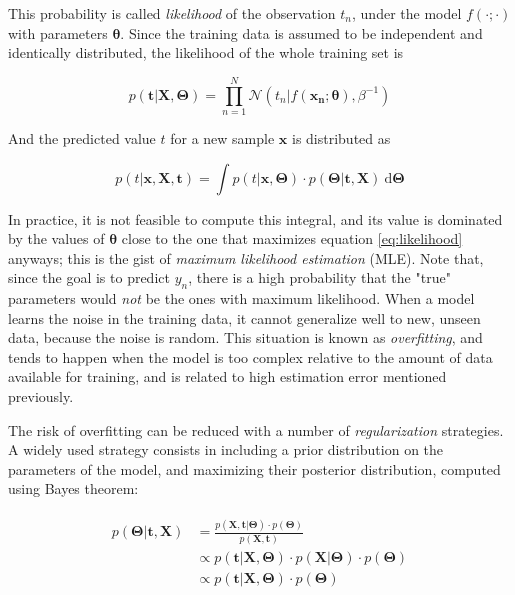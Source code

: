 \documentclass[12pt]{book}
\begin{document}
This probability is called \emph{likelihood} of the observation $t_n$, under the model $f(\cdot;\cdot)$ with parameters $\bm{\theta}$. Since the training data is assumed to be independent and identically distributed, the likelihood of the whole training set is

\begin{equation}
\label{eq:likelihood}
p(\bm{t}\vert\bm{X}, \bm\Theta)=\prod_{n=1}^N  \mathcal{N}(t_n\vert f(\bm{x_n};\bm\theta),\beta^{-1})
\end{equation}

And the predicted value $t$ for a new sample $\bm x$ is distributed as

\begin{equation}
p(t\vert \bm x, \bm X, \bm t)=\int
p(t\vert\bm x,\bm\Theta)\cdot p(\bm\Theta\vert \bm t, \bm X)\ \text{d}\bm\Theta 
\end{equation}

In practice, it is not feasible to compute this integral, and its value is dominated by the values of $\bm\theta$ close to the one that maximizes equation \ref{eq:likelihood} anyways; this is the gist of \emph{maximum likelihood estimation} (MLE). Note that, since the goal is to predict $y_n$, there is a high probability that the "true" parameters would \emph{not} be the ones with maximum likelihood. When a model learns the noise in the training data, it cannot generalize well to new, unseen data, because the noise is random. This situation is known as \emph{overfitting}, and tends to happen when the model is too complex relative to the amount of data available for training, and is related to high estimation error mentioned previously.

The risk of overfitting can be reduced with a number of \emph{regularization} strategies. A widely used strategy consists in including a prior distribution on the parameters of the model, and maximizing their posterior distribution, computed using Bayes theorem:


\begin{align}
\begin{split}
\label{eq:map}
p(\bm\Theta\vert\bm t, \bm X)&=\frac{p(\bm X, \bm t\vert\bm\Theta)\cdot p(\bm\Theta)}{p(\bm X, \bm t)}\\
&\propto p(\bm t\vert \bm X,\bm\Theta)\cdot p(\bm X\vert\bm\Theta)\cdot p(\bm\Theta)\\
&\propto p(\bm t\vert \bm X,\bm\Theta)\cdot p(\bm\Theta)
\end{split}
\end{align}
\end{document}
